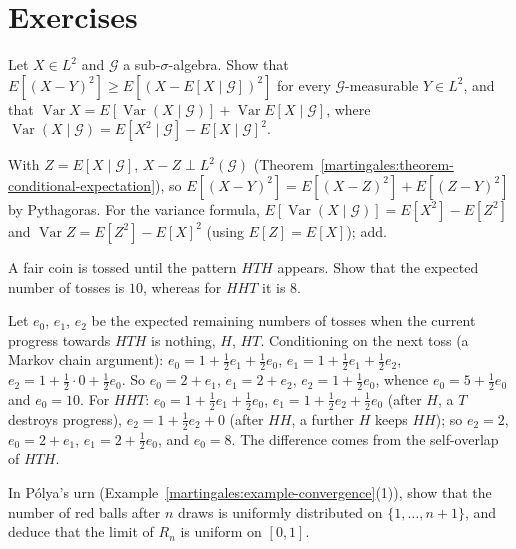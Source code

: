 \section{Exercises}\label{martingales:section-exercises}

\begin{exercise}\label{martingales:exercise-projection}
Let $X \in L^2$ and $\mathcal{G}$ a sub-$\sigma$-algebra. Show that $E[(X - Y)^2] \geq E[(X - E[X \mid \mathcal{G}])^2]$ for every $\mathcal{G}$-measurable $Y \in L^2$, and that $\operatorname{Var}X = E[\operatorname{Var}(X \mid \mathcal{G})] + \operatorname{Var}E[X \mid \mathcal{G}]$, where
$\operatorname{Var}(X \mid \mathcal{G}) = E[X^2 \mid \mathcal{G}] - E[X \mid \mathcal{G}]^2$.
\end{exercise}

\begin{solution}
With $Z = E[X \mid \mathcal{G}]$, $X - Z \perp L^2(\mathcal{G})$ (Theorem~\ref{martingales:theorem-conditional-expectation}), so $E[(X - Y)^2] = E[(X - Z)^2] + E[(Z - Y)^2]$ by Pythagoras. For the variance formula,
$E[\operatorname{Var}(X \mid \mathcal{G})] = E[X^2] - E[Z^2]$ and $\operatorname{Var}Z = E[Z^2] - E[X]^2$ (using $E[Z] = E[X]$); add.
\end{solution}

\begin{exercise}\label{martingales:exercise-hth}
A fair coin is tossed until the pattern $HTH$ appears. Show that the expected number of tosses is $10$, whereas for $HHT$ it is $8$.
\end{exercise}

\begin{solution}
Let $e_0$, $e_1$, $e_2$ be the expected remaining numbers of tosses when the current progress towards $HTH$ is nothing, $H$, $HT$. Conditioning on the next toss (a Markov chain argument): $e_0 = 1 + \frac12e_1 + \frac12e_0$,
$e_1 = 1 + \frac12e_1 + \frac12e_2$, $e_2 = 1 + \frac12\cdot 0 + \frac12e_0$. So $e_0 = 2 + e_1$, $e_1 = 2 + e_2$, $e_2 = 1 + \frac12e_0$, whence $e_0 = 5 + \frac12e_0$ and $e_0 = 10$. For $HHT$: $e_0 = 1 + \frac12e_1 + \frac12e_0$,
$e_1 = 1 + \frac12e_2 + \frac12e_0$ (after $H$, a $T$ destroys progress), $e_2 = 1 + \frac12e_2 + 0$ (after $HH$, a further $H$ keeps $HH$); so $e_2 = 2$, $e_0 = 2 + e_1$, $e_1 = 2 + \frac12e_0$, and $e_0 = 8$. The difference comes from
the self-overlap of $HTH$.
\end{solution}

\begin{exercise}\label{martingales:exercise-polya}
In P\'olya's urn (Example~\ref{martingales:example-convergence}(1)), show that the number of red balls after $n$ draws is uniformly distributed on $\{1, \ldots, n + 1\}$, and deduce that the limit of $R_n$ is uniform on $[0, 1]$.
\end{exercise}

